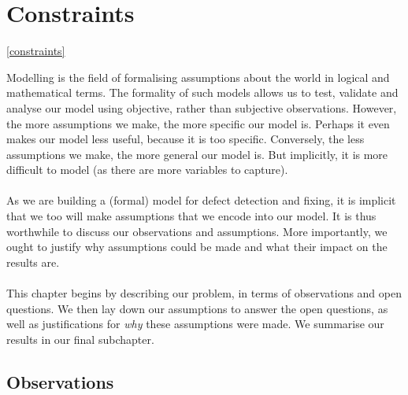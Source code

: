 \section{Constraints} \ref{constraints}

Modelling is the field of formalising assumptions about the world in logical and mathematical terms.
The formality of such models allows us to test, validate and analyse our model using objective, rather than subjective observations.
However, the more assumptions we make, the more specific our model is.
Perhaps it even makes our model less useful, because it is too specific.
Conversely, the less assumptions we make, the more general our model is.
But implicitly, it is more difficult to model (as there are more variables to capture).\\
\\
As we are building a (formal) model for defect detection and fixing, it is implicit that we too will make assumptions that we encode into our model.
It is thus worthwhile to discuss our observations and assumptions.
More importantly, we ought to justify why assumptions could be made and what their impact on the results are.\\
\\
This chapter begins by describing our problem, in terms of observations and open questions.
We then lay down our assumptions to answer the open questions, as well as justifications for {\em why} these assumptions were made.
We summarise our results in our final subchapter.

\subsection{Observations}

